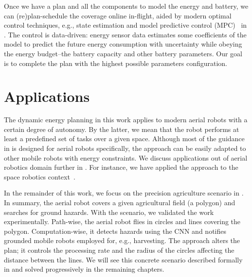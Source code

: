 Once we have a plan and all the components to model the energy and battery, we can (re)plan-schedule the coverage online in-flight, aided by modern optimal control techniques, e.g.,  state estimation and model predictive control (MPC)~\citep{rawlings2017model} in . The control is data-driven: energy sensor data estimates some coefficients of the model to predict the future energy consumption with uncertainty while obeying the energy budget--the battery capacity and other battery parameters. Our goal is to complete the plan with the highest possible parameters configuration.






\section{Applications}

The dynamic energy planning in this work applies to modern aerial robots with a certain degree of autonomy. By the latter, we mean that the robot performs at least a predefined set of tasks over a given space. Although most of the guidance in  is designed for aerial robots specifically, the approach can be easily adapted to other mobile robots with energy constraints. We discuss applications out of aerial robotics domain further in . For instance, we have applied the approach to the space robotics context~\citep{seewald2020beyond}. 

In the remainder of this work, we focus on the precision agriculture scenario in . In summary, the aerial robot covers a given agricultural field (a polygon) and searches for ground hazards. With the scenario, we validated the work experimentally. Path-wise, the aerial robot flies in circles and lines covering the polygon. Computation-wise, it detects hazards using the CNN and notifies grounded mobile robots employed for, e.g., harvesting. The approach alters the plan; it controls the processing rate and the radius of the circles affecting the distance between the lines. We will see this concrete scenario described formally in  and solved progressively in the remaining chapters.



